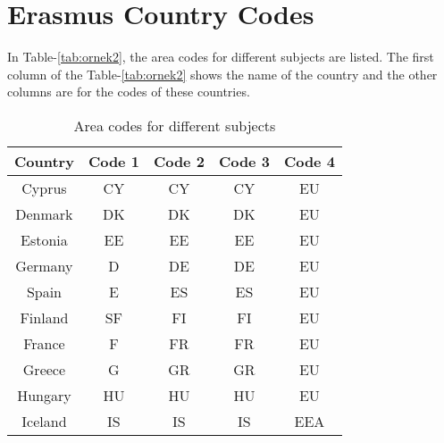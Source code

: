 \chapter{Erasmus Country Codes}
In Table-\ref{tab:ornek2}, the area codes for different subjects are listed. The first column of the Table-\ref{tab:ornek2} shows the name of the country and the other columns are for the codes of these countries.  

\begin{table}[!ht]
\caption{Area codes for different subjects}
\centering
\begin{tabular}{|c|c|c|c|c|}
\hline
\textbf{Country} & \textbf{Code 1} & \textbf{Code 2} & \textbf{Code 3} & \textbf{Code 4}                                                     \\ \hline
Cyprus           & CY              & CY              & CY              & EU                                                                  \\ \hline
Denmark          & DK              & DK              & DK              & EU                                                                  \\ \hline
Estonia          & EE              & EE              & EE              & EU                                                                  \\ \hline
Germany          & D               & DE              & DE              & EU                                                                  \\ \hline
Spain            & E               & ES              & ES              & EU                                                                  \\ \hline
Finland          & SF              & FI              & FI              & EU                                                                  \\ \hline
France           & F               & FR              & FR              & EU                                                                  \\ \hline
Greece           & G               & GR              & GR              & EU                                                                  \\ \hline
Hungary          & HU              & HU              & HU              & EU                                                                  \\ \hline
Iceland          & IS              & IS              & IS              & EEA                                                                 \\ \hline

\end{tabular}
\end{table}

